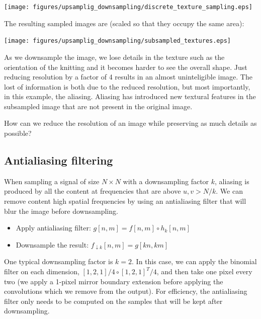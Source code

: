 \begin{center}
  \texttt{[image: figures/upsamplig\_downsampling/discrete\_texture\_sampling.eps]}
\end{center}

The resulting sampled images are (scaled so that they occupy the same area):

\begin{center}
  \texttt{[image: figures/upsamplig\_downsampling/subsampled\_textures.eps]}
\end{center}

As we downsample the image, we lose details in the texture such as the orientation of the knitting and it becomes harder to see the overall shape. Just reducing resolution by a factor of 4 results in an almost uninteligible image. The lost of information is both due to the reduced resolution, but most importantly, in this example, the aliasing. Aliasing has introduced new textural features in the subsampled image that are not present in the original image.

How can we reduce the resolution of an image while preserving as much details as possible?


\subsection{Antialiasing filtering}

When sampling a signal of size $N \times N$ with a downsampling factor $k$, aliasing is produced by all the content at frequencies that are above $u,v > N/k$. We can remove content high spatial frequencies by using an antialiasing filter that will blur the image before downsampling.

\begin{itemize}
  \item Apply antialiasing filter: $g \left[ n,m \right] = f \left[n,m\right] \circ h_k \left[ n,m \right]$
  \item Downsample the result:  $f_{\downarrow k} \left[n,m\right] = g\left[kn,km\right]$
\end{itemize}

One typical downsampling factor is $k=2$. In this case, we can apply the binomial filter on each dimension, $\left[1,2,1\right]/4 \circ \left[1,2,1\right]^T/4$, and then take one pixel every two (we apply a 1-pixel mirror boundary extension before applying the convolutions which we remove from the output). For efficiency, the antialiasing filter only needs to be computed on the samples that will be kept after downsampling.




